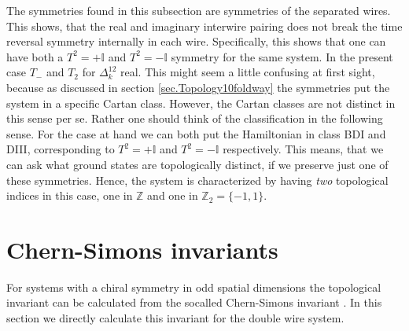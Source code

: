 The symmetries found in this subsection are symmetries of the separated wires. This shows, that the real and imaginary interwire pairing does not break the time reversal symmetry internally in each wire. Specifically, this shows that one can have both a $T^2 = +\mathbb{I}$ and $T^2 = -\mathbb{I}$ symmetry for the same system. In the present case $T_-$ and $T_2$ for $\Delta^{12}_k$ real. This might seem a little confusing at first sight, because as discussed in section \ref{sec.Topology10foldway} the symmetries put the system in a specific Cartan class. However, the Cartan classes are not distinct in this sense per se. Rather one should think of the classification in the following sense. For the case at hand we can both put the Hamiltonian in class BDI and DIII, corresponding to $T^2 = +\mathbb{I}$ and $T^2=-\mathbb{I}$ respectively. This means, that we can ask what ground states are topologically distinct, if we preserve just one of these symmetries. Hence, the system is characterized by having \textit{two} topological indices in this case, one in $\mathbb{Z}$ and one in $\mathbb{Z}_2 = \{-1,1\}$.

\section{Chern-Simons invariants}
\label{sec.2wires_CSinv}
For systems with a chiral symmetry in odd spatial dimensions the topological invariant can be calculated from the socalled Chern-Simons invariant \cite{Ryu.Topology}. In this section we directly calculate this invariant for the double wire system.


